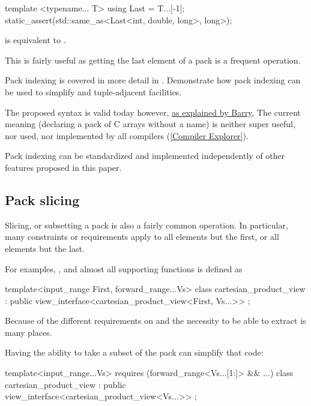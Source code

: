 \documentclass{wg21}
\begin{document}
\begin{colorblock}
template <typename... T>
using Last = T...[-1];
static_assert(std::same_as<Last<int, double, long>, long>);
\end{colorblock}

 is equivalent to .


This is fairly useful as getting the last element of a pack is a frequent operation.


Pack indexing is covered in more detail in .  Demonstrate how pack indexing can be used to simplify
 and tuple-adjacent facilities.

The proposed syntax is valid today however, \href{https://www.open-std.org/jtc1/sc22/wg21/docs/papers/2020/p1858r2.html#pack-indexing-ambiguity}{as explained by Barry},
The current meaning (declaring a pack of C arrays without a name) is neither super useful, nor used, nor implemented by all compilers (\href{https://godbolt.org/z/6obhffPTP}{[Compiler Explorer]}).

Pack indexing can be standardized and implemented independently of other features proposed in this paper.


\subsection{Pack slicing}

Slicing, or subsetting a pack is also a fairly common operation.
In particular, many constraints or requirements apply to all elements but the first, or all elements but the last.

For examples, , and almost all supporting functions is defined as

\begin{colorblock}
template<input_range First, forward_range...Vs>
class cartesian_product_view : public view_interface<cartesian_product_view<First, Vs...>> {};
\end{colorblock}

Because of the different requirements on  and the necessity to be able to extract 
is many places.

Having the ability to take a subset of the pack can simplify that code:

\begin{colorblock}
template<input_range...Vs>
requires (forward_range<Vs...[1:]> && ...)
class cartesian_product_view : public view_interface<cartesian_product_view<Vs...>> {};
\end{colorblock}
\end{document}
